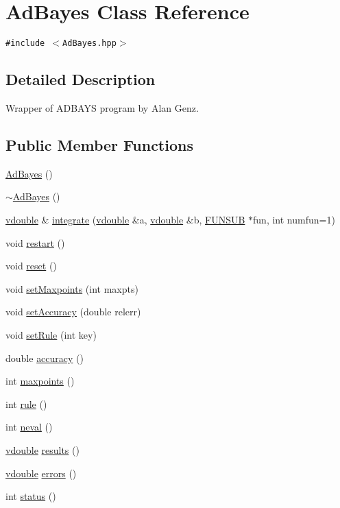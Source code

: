 \hypertarget{classAdBayes}{
\section{Ad\-Bayes Class Reference}
\label{classAdBayes}
}
{\tt \#include $<$Ad\-Bayes.hpp$>$}



\subsection{Detailed Description}
Wrapper of ADBAYS program by Alan Genz. 

\subsection*{Public Member Functions}
\begin{CompactItemize}
\item 
\hyperlink{classAdBayes_a0}{Ad\-Bayes} ()
\item 
\hyperlink{classAdBayes_a1}{$\sim$Ad\-Bayes} ()
\item 
\hyperlink{PoissonGammaFit_8hpp_a0}{vdouble} \& \hyperlink{classAdBayes_a2}{integrate} (\hyperlink{PoissonGammaFit_8hpp_a0}{vdouble} \&a, \hyperlink{PoissonGammaFit_8hpp_a0}{vdouble} \&b, \hyperlink{AdBayes_8hpp_a3}{FUNSUB} $\ast$fun, int numfun=1)
\item 
void \hyperlink{classAdBayes_a3}{restart} ()
\item 
void \hyperlink{classAdBayes_a4}{reset} ()
\item 
void \hyperlink{classAdBayes_a5}{set\-Maxpoints} (int maxpts)
\item 
void \hyperlink{classAdBayes_a6}{set\-Accuracy} (double relerr)
\item 
void \hyperlink{classAdBayes_a7}{set\-Rule} (int key)
\item 
double \hyperlink{classAdBayes_a8}{accuracy} ()
\item 
int \hyperlink{classAdBayes_a9}{maxpoints} ()
\item 
int \hyperlink{classAdBayes_a10}{rule} ()
\item 
int \hyperlink{classAdBayes_a11}{neval} ()
\item 
\hyperlink{PoissonGammaFit_8hpp_a0}{vdouble} \hyperlink{classAdBayes_a12}{results} ()
\item 
\hyperlink{PoissonGammaFit_8hpp_a0}{vdouble} \hyperlink{classAdBayes_a13}{errors} ()
\item 
int \hyperlink{classAdBayes_a14}{status} ()
\end{CompactItemize}


